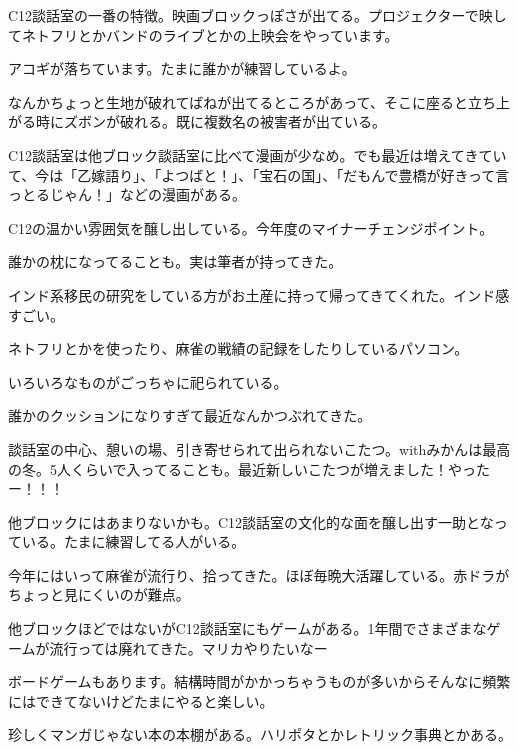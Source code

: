 {\small

  C12談話室の一番の特徴。映画ブロックっぽさが出てる。プロジェクターで映してネトフリとかバンドのライブとかの上映会をやっています。

  アコギが落ちています。たまに誰かが練習しているよ。

  なんかちょっと生地が破れてばねが出てるところがあって、そこに座ると立ち上がる時にズボンが破れる。既に複数名の被害者が出ている。

  C12談話室は他ブロック談話室に比べて漫画が少なめ。でも最近は増えてきていて、今は「乙嫁語り」、「よつばと！」、「宝石の国」、「だもんで豊橋が好きって言っとるじゃん！」などの漫画がある。

  C12の温かい雰囲気を醸し出している。今年度のマイナーチェンジポイント。

  誰かの枕になってることも。実は筆者が持ってきた。

  インド系移民の研究をしている方がお土産に持って帰ってきてくれた。インド感すごい。

  ネトフリとかを使ったり、麻雀の戦績の記録をしたりしているパソコン。

  いろいろなものがごっちゃに祀られている。

  誰かのクッションになりすぎて最近なんかつぶれてきた。

  \hfill

  \hfill
  
  談話室の中心、憩いの場、引き寄せられて出られないこたつ。withみかんは最高の冬。5人くらいで入ってることも。最近新しいこたつが増えました！やったー！！！

  他ブロックにはあまりないかも。C12談話室の文化的な面を醸し出す一助となっている。たまに練習してる人がいる。

  今年にはいって麻雀が流行り、拾ってきた。ほぼ毎晩大活躍している。赤ドラがちょっと見にくいのが難点。

  他ブロックほどではないがC12談話室にもゲームがある。1年間でさまざまなゲームが流行っては廃れてきた。マリカやりたいなー

  ボードゲームもあります。結構時間がかかっちゃうものが多いからそんなに頻繁にはできてないけどたまにやると楽しい。

  珍しくマンガじゃない本の本棚がある。ハリポタとかレトリック事典とかある。

  }

